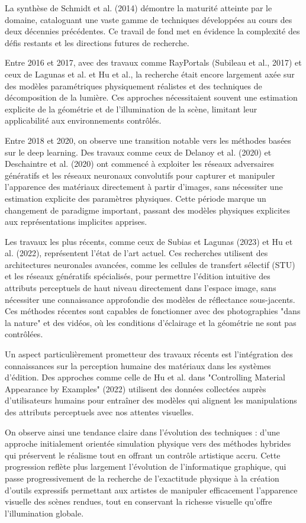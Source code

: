 \documentclass[runningheads]{llncs}
\begin{document}
La synthèse de Schmidt et al. (2014) démontre la maturité atteinte par le domaine, cataloguant une vaste gamme de techniques développées au cours des deux décennies précédentes. Ce travail de fond met en évidence la complexité des défis restants et les directions futures de recherche.

Entre 2016 et 2017, avec des travaux comme RayPortals (Subileau et al., 2017) et ceux de Lagunas et al. et Hu et al., la recherche était encore largement axée sur des modèles paramétriques physiquement réalistes et des techniques de décomposition de la lumière. Ces approches nécessitaient souvent une estimation explicite de la géométrie et de l'illumination de la scène, limitant leur applicabilité aux environnements contrôlés.

Entre 2018 et 2020, on observe une transition notable vers les méthodes basées sur le deep learning. Des travaux comme ceux de Delanoy et al. (2020) et Deschaintre et al. (2020) ont commencé à exploiter les réseaux adversaires génératifs et les réseaux neuronaux convolutifs pour capturer et manipuler l'apparence des matériaux directement à partir d'images, sans nécessiter une estimation explicite des paramètres physiques. Cette période marque un changement de paradigme important, passant des modèles physiques explicites aux représentations implicites apprises.

Les travaux les plus récents, comme ceux de Subias et Lagunas (2023) et Hu et al. (2022), représentent l'état de l'art actuel. Ces recherches utilisent des architectures neuronales avancées, comme les cellules de transfert sélectif (STU) et les réseaux génératifs spécialisés, pour permettre l'édition intuitive des attributs perceptuels de haut niveau directement dans l'espace image, sans nécessiter une connaissance approfondie des modèles de réflectance sous-jacents. Ces méthodes récentes sont capables de fonctionner avec des photographies "dans la nature" et des vidéos, où les conditions d'éclairage et la géométrie ne sont pas contrôlées.

Un aspect particulièrement prometteur des travaux récents est l'intégration des connaissances sur la perception humaine des matériaux dans les systèmes d'édition. Des approches comme celle de Hu et al. dans "Controlling Material Appearance by Examples" (2022) utilisent des données collectées auprès d'utilisateurs humains pour entraîner des modèles qui alignent les manipulations des attributs perceptuels avec nos attentes visuelles.

On observe ainsi une tendance claire dans l'évolution des techniques : d'une approche initialement orientée simulation physique vers des méthodes hybrides qui préservent le réalisme tout en offrant un contrôle artistique accru. Cette progression reflète plus largement l'évolution de l'informatique graphique, qui passe progressivement de la recherche de l'exactitude physique à la création d'outils expressifs permettant aux artistes de manipuler efficacement l'apparence visuelle des scènes rendues, tout en conservant la richesse visuelle qu'offre l'illumination globale.
\end{document}
